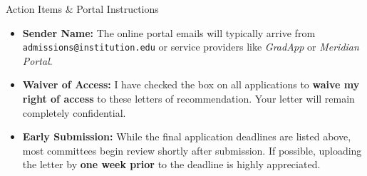 \begin{highlightbox}{Action Items \& Portal Instructions}
\begin{itemize}
    \item \textbf{Sender Name:} The online portal emails will typically arrive from \texttt{admissions@institution.edu} or service providers like \textit{GradApp} or \textit{Meridian Portal}.
    \item \textbf{Waiver of Access:} I have checked the box on all applications to \textbf{waive my right of access} to these letters of recommendation. Your letter will remain completely confidential.
    \item \textbf{Early Submission:} While the final application deadlines are listed above, most committees begin review shortly after submission. If possible, uploading the letter by \textbf{one week prior} to the deadline is highly appreciated.
\end{itemize}
\end{highlightbox}

